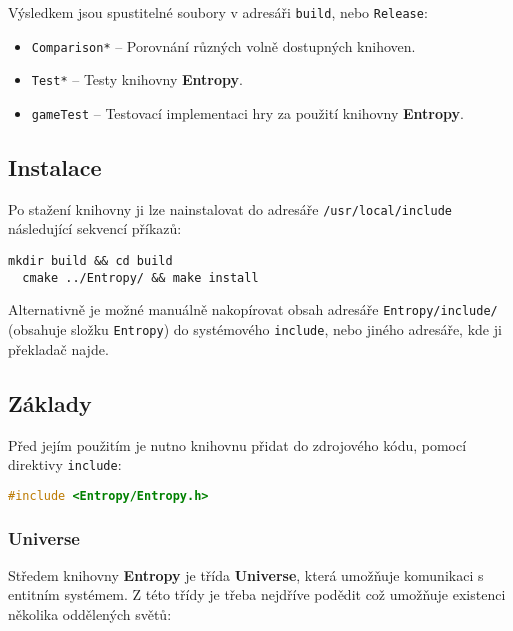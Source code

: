 \noindent Výsledkem jsou spustitelné soubory v adresáři \texttt{build}, nebo \texttt{Release}:
\begin{itemize}
	\item \texttt{Comparison*} -- Porovnání různých volně dostupných knihoven.
	\item \texttt{Test*} -- Testy knihovny \textbf{Entropy}.
	\item \texttt{gameTest} -- Testovací implementaci hry za použití knihovny \textbf{Entropy}.
\end{itemize}

\subsection*{Instalace}

Po stažení knihovny ji lze nainstalovat do adresáře \texttt{/usr/local/include} následující sekvencí příkazů: 

\begin{lstlisting}[basicstyle=\ttfamily]
  mkdir build && cd build
  cmake ../Entropy/ && make install
\end{lstlisting}

\noindent Alternativně je možné manuálně nakopírovat obsah adresáře \texttt{Entropy/include/} (obsahuje složku \texttt{Entropy}) do systémového \texttt{include}, nebo jiného adresáře, kde ji překladač najde.

\subsection*{Základy}

Před jejím použitím je nutno knihovnu přidat do zdrojového kódu, pomocí direktivy \texttt{include}:

\begin{lstlisting}[backgroundcolor = \color{lightgray}, language = C++, xleftmargin = 2cm, framexleftmargin = 1em, tabsize=4]
#include <Entropy/Entropy.h>
\end{lstlisting}

\subsubsection*{Universe}

Středem knihovny \textbf{Entropy} je třída \textbf{Universe}, která umožňuje komunikaci s entitním systémem. Z této třídy je třeba nejdříve podědit což umožňuje existenci několika oddělených světů:

